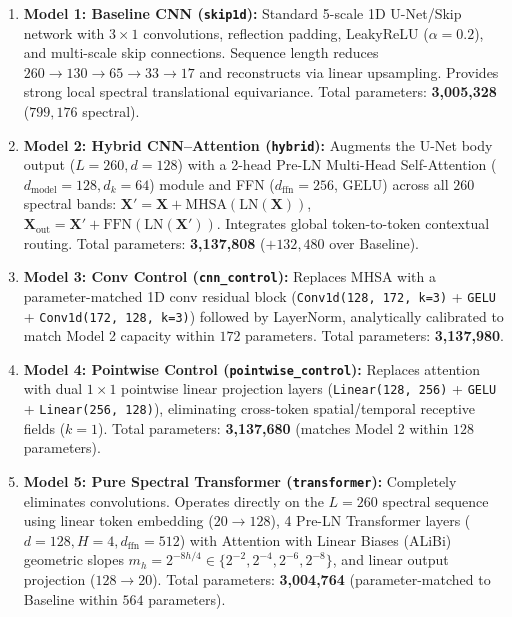 \begin{enumerate}[noitemsep, topsep=1pt]
    \item \textbf{Model 1: Baseline CNN (\texttt{skip1d}):} Standard 5-scale 1D U-Net/Skip network with $3 \times 1$ convolutions, reflection padding, LeakyReLU ($\alpha=0.2$), and multi-scale skip connections. Sequence length reduces $260 \to 130 \to 65 \to 33 \to 17$ and reconstructs via linear upsampling. Provides strong local spectral translational equivariance. Total parameters: \textbf{3,005,328} ($799,176$ spectral).
    \item \textbf{Model 2: Hybrid CNN--Attention (\texttt{hybrid}):} Augments the U-Net body output ($L=260, d=128$) with a 2-head Pre-LN Multi-Head Self-Attention ($d_\text{model}=128, d_k=64$) module and FFN ($d_\text{ffn}=256$, GELU) across all $260$ spectral bands: $\mathbf{X}' = \mathbf{X} + \text{MHSA}(\text{LN}(\mathbf{X}))$, $\mathbf{X}_\text{out} = \mathbf{X}' + \text{FFN}(\text{LN}(\mathbf{X}'))$. Integrates global token-to-token contextual routing. Total parameters: \textbf{3,137,808} ($+132,480$ over Baseline).
    \item \textbf{Model 3: Conv Control (\texttt{cnn\_control}):} Replaces MHSA with a parameter-matched 1D conv residual block (\texttt{Conv1d(128, 172, k=3)} + \texttt{GELU} + \texttt{Conv1d(172, 128, k=3)}) followed by LayerNorm, analytically calibrated to match Model 2 capacity within $172$ parameters. Total parameters: \textbf{3,137,980}.
    \item \textbf{Model 4: Pointwise Control (\texttt{pointwise\_control}):} Replaces attention with dual $1 \times 1$ pointwise linear projection layers (\texttt{Linear(128, 256)} + \texttt{GELU} + \texttt{Linear(256, 128)}), eliminating cross-token spatial/temporal receptive fields ($k=1$). Total parameters: \textbf{3,137,680} (matches Model 2 within $128$ parameters).
    \item \textbf{Model 5: Pure Spectral Transformer (\texttt{transformer}):} Completely eliminates convolutions. Operates directly on the $L=260$ spectral sequence using linear token embedding ($20 \to 128$), 4 Pre-LN Transformer layers ($d=128, H=4, d_\text{ffn}=512$) with Attention with Linear Biases (ALiBi) geometric slopes $m_h = 2^{-8h/4} \in \{2^{-2}, 2^{-4}, 2^{-6}, 2^{-8}\}$, and linear output projection ($128 \to 20$). Total parameters: \textbf{3,004,764} (parameter-matched to Baseline within $564$ parameters).
\end{enumerate}

